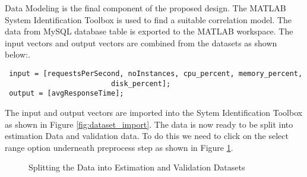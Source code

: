 \documentclass[article,type=msc,colorback,12pt,accentcolor=tud8b,table]{tudthesis}
\begin{document}
 Data Modeling is the final component of the proposed design. The MATLAB System Identification Toolbox is used to find a suitable correlation model. The data from MySQL database table is exported to the MATLAB workspace. The input vectors and output vectors are combined from the datasets as shown below:.   
 \begin{lstlisting} 
 input = [requestsPerSecond, noInstances, cpu_percent, memory_percent, 
						 disk_percent];
 output = [avgResponseTime];
 \end{lstlisting}
  The input and output vectors are imported into the Sytem Identification Toolbox as shown in Figure \ref{fig:dataset_import}. The data is now ready to be split into estimation Data and validation data. To do this we need to click on the select range option underneath preprocess step as shown in Figure \ref{fig:split_dataset}. 
  
      \begin{figure}[h]
      	\begin{center}
      		\makebox[\textwidth]{\texttt{[image: D7]}}
      	\end{center}
      	\caption{Splitting the Data into Estimation and Validation Datasets}
      	\label{fig:split_dataset}
      \end{figure}
  
\end{document}
